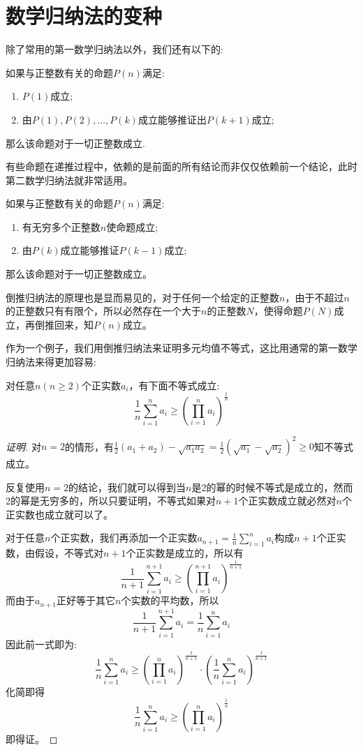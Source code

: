 
\section{数学归纳法的变种}
\label{sec:mathematical-induction}
除了常用的第一数学归纳法以外，我们还有以下的:
\begin{principle}[第二数学归纳法]
如果与正整数有关的命题$P(n)$满足:
  \begin{enumerate}
  \item $P(1)$成立;
  \item 由$P(1),P(2),\dots,P(k)$成立能够推证出$P(k+1)$成立;
  \end{enumerate}
那么该命题对于一切正整数成立.
\end{principle}
有些命题在递推过程中，依赖的是前面的所有结论而非仅仅依赖前一个结论，此时第二数学归纳法就非常适用。
\begin{principle}[倒推归纳法]
如果与正整数有关的命题$P(n)$满足:
  \begin{enumerate}
  \item 有无穷多个正整数$n$使命题成立;
  \item 由$P(k)$成立能够推证$P(k-1)$成立;
  \end{enumerate}
那么该命题对于一切正整数成立。
\end{principle}
倒推归纳法的原理也是显而易见的，对于任何一个给定的正整数$n$，由于不超过$n$的正整数只有有限个，所以必然存在一个大于$n$的正整数$N$，使得命题$P(N)$成立，再倒推回来，知$P(n)$成立。

作为一个例子，我们用倒推归纳法来证明多元均值不等式，这比用通常的第一数学归纳法来得更加容易:

\begin{statement}[均值不等式]
  对任意$n(n\geqslant2)$个正实数$a_i$，有下面不等式成立:
\[ \frac{1}{n}\sum_{i=1}^na_i \geqslant \left( \prod_{i=1}^na_i \right)^{\frac{1}{n}} \]
\end{statement}

\begin{proof}[证明]
  对$n=2$的情形，有$\frac{1}{2}(a_1+a_2)-\sqrt{a_1a_2}=\frac{1}{2}(\sqrt{a_1}-\sqrt{a_2})^2\geqslant 0$知不等式成立。

 反复使用$n=2$的结论，我们就可以得到当$n$是2的幂的时候不等式是成立的，然而2的幂是无穷多的，所以只要证明，不等式如果对$n+1$个正实数成立就必然对$n$个正实数也成立就可以了。

对于任意$n$个正实数，我们再添加一个正实数$a_{n+1}=\frac{1}{n}\sum_{i=1}^na_i$构成$n+1$个正实数，由假设，不等式对$n+1$个正实数是成立的，所以有
\[
\frac{1}{n+1}\sum_{i=1}^{n+1}a_i \geqslant \left( \prod_{i=1}^{n+1}a_i \right)^{\frac{1}{n+1}}
\]
而由于$a_{n+1}$正好等于其它$n$个实数的平均数，所以
\[ \frac{1}{n+1}\sum_{i=1}^{n+1}a_i = \frac{1}{n}\sum_{i=1}^{n}a_i \]
因此前一式即为:
\[
\frac{1}{n}\sum_{i=1}^{n}a_i \geqslant \left( \prod_{i=1}^{n}a_i \right)^{\frac{1}{n+1}} \cdot \left( \frac{1}{n}\sum_{i=1}^na_i \right)^{\frac{1}{n+1}}
\]
化简即得
\[
\frac{1}{n}\sum_{i=1}^na_i \geqslant \left( \prod_{i=1}^na_i \right)^{\frac{1}{n}} 
\]
即得证。
\end{proof}

